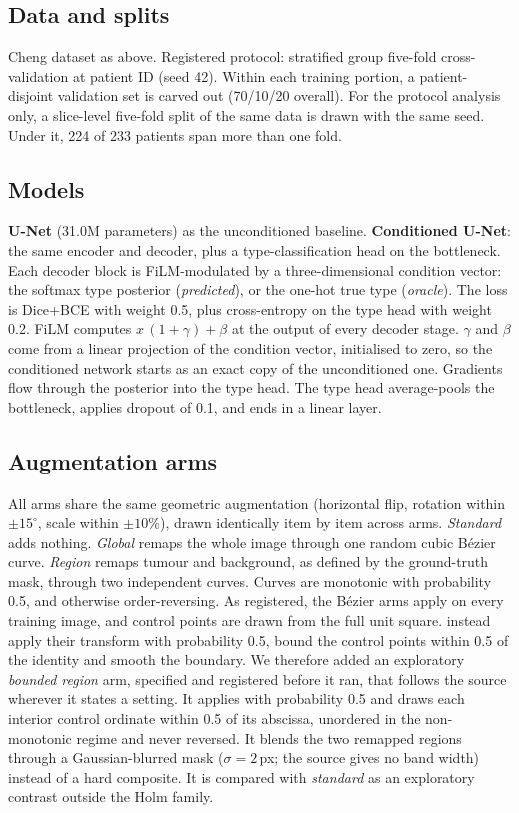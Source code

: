 \documentclass[11pt,a4paper]{article}
\begin{document}
\subsection{Data and splits}
Cheng dataset as above. Registered protocol: stratified group five-fold
cross-validation at patient ID (seed 42). Within each training portion, a
patient-disjoint validation set is carved out (70/10/20 overall). For the
protocol analysis only, a slice-level five-fold split of the same data is drawn
with the same seed. Under it, 224 of 233 patients span more than one fold.

\subsection{Models}
\textbf{U-Net} (31.0M parameters) as the unconditioned baseline.
\textbf{Conditioned U-Net}: the same encoder and decoder, plus a type-classification
head on the bottleneck. Each decoder block is FiLM-modulated by a
three-dimensional condition vector: the softmax type posterior (\emph{predicted}),
or the one-hot true type (\emph{oracle}). The loss is Dice+BCE with weight 0.5,
plus cross-entropy on the type head with weight 0.2.
FiLM computes $x\,(1+\gamma)+\beta$ at the output of every decoder stage. $\gamma$
and $\beta$ come from a linear projection of the condition vector, initialised to
zero, so the conditioned network starts as an exact copy of the unconditioned
one. Gradients flow through the posterior into the type head. The type head
average-pools the bottleneck, applies dropout of 0.1, and ends in a linear layer.

\subsection{Augmentation arms}
All arms share the same geometric augmentation (horizontal flip, rotation within
$\pm15^\circ$, scale within $\pm10\%$), drawn identically item by item across
arms. \emph{Standard} adds nothing. \emph{Global} remaps the whole image through
one random cubic B\'ezier curve. \emph{Region} remaps tumour and background, as
defined by the ground-truth mask, through two independent curves. Curves are
monotonic with probability 0.5, and otherwise order-reversing. As registered, the
B\'ezier arms apply on every training image, and control points are drawn from
the full unit square. \citet{yurdakul2026} instead apply their transform with
probability 0.5, bound the control points within 0.5 of the identity and smooth
the boundary. We therefore added an exploratory \emph{bounded region} arm,
specified and registered before it ran, that follows the source wherever it
states a setting. It applies with probability 0.5 and draws each interior control
ordinate within 0.5 of its abscissa, unordered in the non-monotonic regime and
never reversed. It blends the two remapped regions through a Gaussian-blurred
mask ($\sigma=2$\,px; the source gives no band width) instead of a hard
composite. It is compared with \emph{standard} as an exploratory contrast outside
the Holm family.
\end{document}
